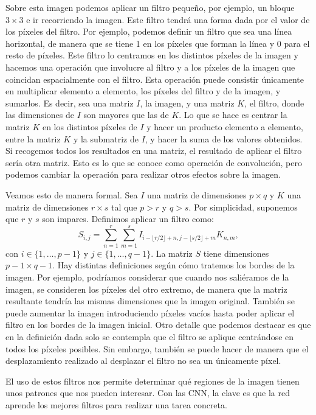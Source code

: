 \documentclass[a4paper,12pt,oneside,titlepage]{book}
\begin{document}
Sobre esta imagen podemos aplicar un filtro pequeño, por ejemplo, un bloque $3\times 3$ e ir recorriendo la imagen. Este filtro tendrá una forma dada por el valor de los píxeles del filtro. Por ejemplo, podemos definir un filtro que sea una línea horizontal, de manera que se tiene 1 en los píxeles que forman la línea y 0 para el resto de píxeles. Este filtro lo centramos en los distintos píxeles de la imagen y hacemos una operación que involucre al filtro y a los píxeles de la imagen que coincidan espacialmente con el filtro. Esta operación puede consistir únicamente en multiplicar elemento a elemento, los píxeles del filtro y de la imagen, y sumarlos. Es decir, sea una matriz $I$, la imagen, y una matriz $K$, el filtro, donde las dimensiones de $I$ son mayores que las de $K$. Lo que se hace es centrar la matriz $K$ en los distintos píxeles de $I$ y hacer un producto elemento a elemento, entre la matriz $K$ y la submatriz de $I$, y hacer la suma de los valores obtenidos. Si recogemos todos los resultados en una matriz, el resultado de aplicar el filtro sería otra matriz. Esto es lo que se conoce como operación de convolución, pero podemos cambiar la operación para realizar otros efectos sobre la imagen.

Veamos esto de manera formal. Sea $I$ una matriz de dimensiones $p\times q$ y $K$ una matriz de dimensiones $r\times s$ tal que $p>r$ y $q>s$. Por simplicidad, suponemos que $r$ y $s$ son impares. Definimos aplicar un filtro como:
\begin{equation}
  \label{ec:def_filtro}
  S_{i, j} = \sum_{n=1}^{r}\sum_{m=1}^{s}I_{i - \lfloor r/2 \rfloor + n, j - \lfloor s/2 \rfloor  + m}K_{n,m},
\end{equation}
con $i\in\{1,\dots, p -1 \}$ y $j\in\{1,\dots, q -1\}$. La matriz $S$ tiene dimensiones $p-1\times q-1$. Hay distintas definiciones según cómo tratemos los bordes de la imagen. Por ejemplo, podríamos considerar que cuando nos saliéramos de la imagen, se consideren los píxeles del otro extremo, de manera que la matriz resultante tendría las mismas dimensiones que la imagen original. También se puede aumentar la imagen introduciendo píxeles vacíos hasta poder aplicar el filtro en los bordes de la imagen inicial. Otro detalle que podemos destacar es que en la definición dada solo se contempla que el filtro se aplique centrándose en todos los píxeles posibles. Sin embargo, también se puede hacer de manera que el desplazamiento realizado al desplazar el filtro no sea un únicamente  píxel.

El uso de estos filtros nos permite determinar qué regiones de la imagen tienen unos patrones que nos pueden interesar. Con las CNN, la clave es que la red aprende los mejores filtros para realizar una tarea concreta. 
\end{document}

